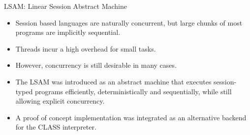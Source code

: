 \documentclass{beamer}
\begin{document}






\begin{frame}{LSAM: Linear Session Abstract Machine}
  \begin{itemize}
    \item Session based languages are naturally concurrent, but large chunks of most programs are implicitly sequential.
    \item Threads incur a high overhead for small tasks.
    \item However, concurrency is still desirable in many cases.
    \item The LSAM was introduced as an abstract machine that executes session-typed programs efficiently, deterministically and sequentially, while still allowing explicit concurrency.
    \item A proof of concept implementation was integrated as an alternative backend for the CLASS interpreter.
  \end{itemize}
\end{frame}
\end{document}
